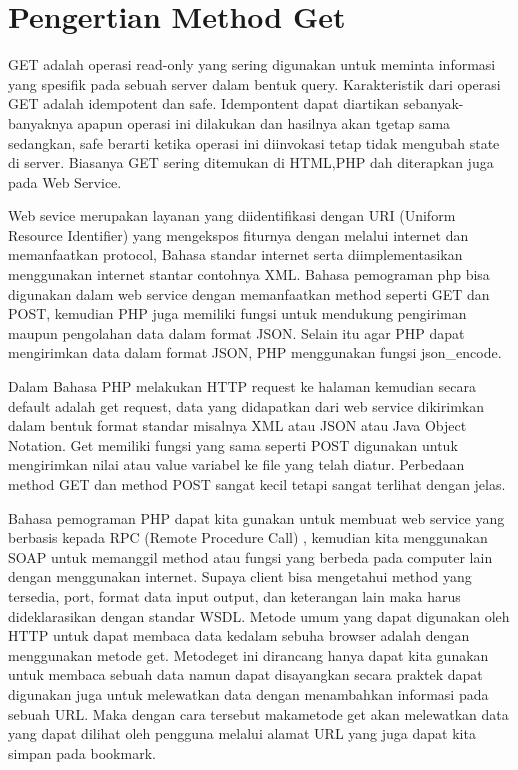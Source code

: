 \section{Pengertian Method Get}
GET adalah operasi read-only yang sering digunakan untuk meminta informasi yang spesifik pada sebuah server dalam bentuk query. 
Karakteristik dari operasi GET adalah idempotent dan safe. Idempontent dapat diartikan sebanyak-banyaknya apapun operasi ini dilakukan 
dan 
hasilnya akan tgetap sama sedangkan, safe berarti ketika operasi ini diinvokasi tetap tidak mengubah state di server.
Biasanya GET sering ditemukan di HTML,PHP dah diterapkan juga pada Web Service.

Web sevice merupakan layanan yang diidentifikasi dengan URI (Uniform Resource Identifier) yang mengekspos fiturnya dengan melalui 
internet dan memanfaatkan protocol, Bahasa standar internet  serta diimplementasikan menggunakan internet stantar contohnya XML. Bahasa 
pemograman php bisa digunakan dalam web service dengan memanfaatkan method seperti GET dan POST, kemudian PHP juga memiliki fungsi 
untuk mendukung pengiriman maupun pengolahan data dalam format JSON. Selain itu  agar PHP dapat mengirimkan data dalam format JSON, PHP 
menggunakan fungsi json_encode.  

Dalam Bahasa PHP melakukan HTTP request ke halaman kemudian secara default adalah get request, data yang didapatkan dari web service 
dikirimkan dalam bentuk format standar misalnya XML atau JSON atau Java Object Notation. Get memiliki fungsi yang sama seperti POST 
digunakan untuk mengirimkan nilai atau value variabel ke file yang telah diatur. Perbedaan method GET dan method POST sangat kecil 
tetapi sangat terlihat dengan jelas.

Bahasa pemograman PHP dapat kita gunakan untuk membuat web service yang  berbasis kepada RPC (Remote Procedure Call) , kemudian kita 
menggunakan SOAP untuk memanggil method atau fungsi yang berbeda pada computer lain dengan menggunakan internet. Supaya client bisa 
mengetahui method yang tersedia, port, format data input output, dan keterangan lain maka harus  dideklarasikan dengan standar WSDL.    
Metode umum yang dapat digunakan oleh HTTP untuk dapat membaca data kedalam sebuha browser adalah dengan menggunakan metode get. 
Metodeget ini dirancang hanya dapat kita gunakan untuk membaca sebuah data namun dapat disayangkan secara praktek dapat digunakan juga untuk melewatkan data dengan menambahkan informasi pada sebuah URL. Maka dengan cara tersebut makametode get akan melewatkan data yang dapat dilihat oleh pengguna melalui alamat URL yang juga dapat kita simpan pada bookmark.

